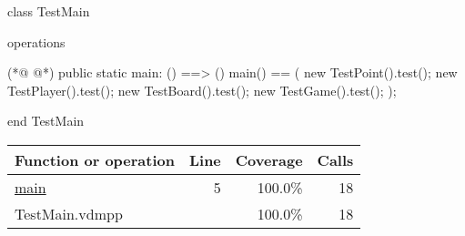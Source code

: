 \begin{vdmpp}[breaklines=true]
class TestMain

operations
 
(*@
\label{main:5}
@*)
 public static main: () ==> ()
 main() ==
 (
  new TestPoint().test();
  new TestPlayer().test();
  new TestBoard().test();
  new TestGame().test();
 );

end TestMain
\end{vdmpp}
\bigskip
\begin{longtable}{|l|r|r|r|}
\hline
Function or operation & Line & Coverage & Calls \\
\hline
\hline
\hyperref[main:5]{main} & 5&100.0\% & 18 \\
\hline
\hline
TestMain.vdmpp & & 100.0\% & 18 \\
\hline
\end{longtable}

